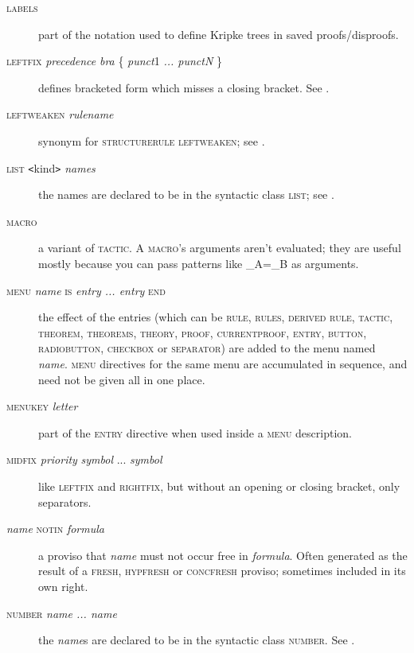 \begin{description}
\item[\textsc{labels}] part of the notation used to define Kripke trees in saved proofs/disproofs.

\item[\textsc{leftfix} \textit{precedence} \textit{bra} \{ \textit{punct}1 \textit{... punctN} \}] defines bracketed form which misses a closing bracket. See .

\item[\textsc{leftweaken} \textit{rulename}] synonym for \textsc{structurerule} \textsc{leftweaken}; see .

\item[\textsc{list \texttt{<}}kind\textsc{\texttt{>}} \textit{names}] the names are declared to be in the syntactic class \textsc{list}; see .

\item[\textsc{macro}] a variant of \textsc{tactic}. A \textsc{macro}'s arguments aren't evaluated; they are useful mostly because you can pass patterns like \_A=\_B as arguments.

\item[\textsc{menu} \textit{name} \textsc{is} \textit{entry ... entry} \textsc{end}] the effect of the entries (which can be \textsc{rule, rules, derived rule, tactic, theorem, theorems, theory, proof, currentproof, entry, button, radiobutton, checkbox} or \textsc{separator)} are added to the menu named \textit{name}. \textsc{menu} directives for the same menu are accumulated in sequence, and need not be given all in one place.

\item[\textsc{menukey} \textit{letter}] part of the \textsc{entry} directive when used inside a \textsc{menu} description.

\item[\textsc{midfix} \textit{priority} \textit{symbol} ... \textit{symbol}]\! like \textsc{leftfix} and \textsc{rightfix}, but without an opening or closing bracket, only separators.
 
\item[\textit{name} \textsc{notin} \textit{formula}] a proviso that \textit{name} must not occur free in \textit{formula}. Often generated as the result of a \textsc{fresh, hypfresh} or \textsc{concfresh} proviso; sometimes included in its own right.

\item[\textsc{number} \textit{name ... name}] the \textit{name}s are declared to be in the syntactic class \textsc{number}. See .


\end{description}
